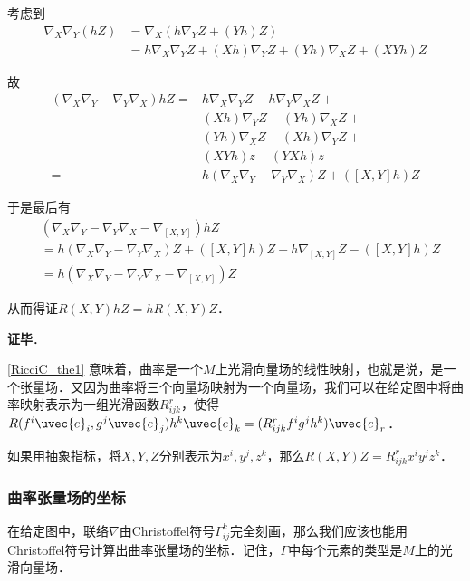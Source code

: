 考虑到
\begin{equation}
\begin{aligned}
\nabla_X\nabla_Y(hZ)&=\nabla_X(h\nabla_YZ+(Yh)Z)\\
&=h\nabla_X\nabla_YZ+(Xh)\nabla_YZ+(Yh)\nabla_XZ+(XYh)Z
\end{aligned}
\end{equation}

故
\begin{equation}
\begin{aligned}
(\nabla_X\nabla_Y-\nabla_Y\nabla_X)hZ=& h\nabla_X\nabla_YZ-h\nabla_Y\nabla_XZ+\\&(Xh)\nabla_YZ-(Yh)\nabla_XZ+\\&(Yh)\nabla_XZ-(Xh)\nabla_YZ+\\&(XYh)z-(YXh)z\\
=& h(\nabla_X\nabla_Y-\nabla_Y\nabla_X)Z+([X, Y]h)Z
\end{aligned}
\end{equation}

于是最后有
\begin{equation}
\begin{aligned}
&(\nabla_X\nabla_Y-\nabla_Y\nabla_X-\nabla_{[X, Y]})hZ\\
&=h(\nabla_X\nabla_Y-\nabla_Y\nabla_X)Z+([X, Y]h)Z-h\nabla_{[X, Y]}Z-([X, Y]h)Z\\
&=h(\nabla_X\nabla_Y-\nabla_Y\nabla_X-\nabla_{[X, Y]})Z
\end{aligned}
\end{equation}

从而得证$R(X, Y)hZ=hR(X, Y)Z$．

\textbf{证毕}．

\autoref{RicciC_the1} 意味着，曲率是一个$M$上光滑向量场的线性映射，也就是说，是一个张量场．又因为曲率将三个向量场映射为一个向量场，我们可以在给定图中将曲率映射表示为一组光滑函数$R^r_{ijk}$，使得$R(f^i\uvec{e}_i, g^j\uvec{e}_j)h^k\uvec{e}_k=(R^r_{ijk}f^ig^jh^k)\uvec{e}_r$．

如果用抽象指标，将$X, Y, Z$分别表示为$x^i, y^j, z^k$，那么$R(X, Y)Z=R^r_{ijk}x^iy^jz^k$．


\subsubsection{曲率张量场的坐标}

在给定图中，联络$\nabla$由Christoffel符号$\Gamma^k_{ij}$完全刻画，那么我们应该也能用Christoffel符号计算出曲率张量场的坐标．记住，$\Gamma$中每个元素的类型是$M$上的光滑向量场．

